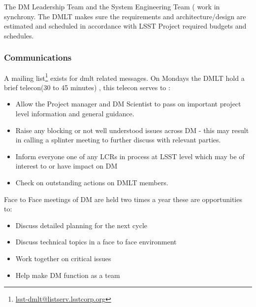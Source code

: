 The DM Leadership Team and the System Engineering Team ( work in synchrony. 
The DMLT makes sure the requirements and architecture/design are estimated and scheduled in accordance with LSST Project required budgets and schedules.

 \subsubsection{Communications} 
 A mailing list\footnote{\url{lsst-dmlt@listserv.lsstcorp.org}} exists for dmlt related messages. 
 On Mondays the DMLT hold a brief telecon(30 to 45 minutes) , this telecon serves to :
\begin{itemize}
\item Allow the Project manager and DM Scientist  to pass on important project level information and general guidance. 
\item Raise any blocking or not well understood issues across DM - this may result in calling a splinter meeting to further discuss with relevant parties.
\item Inform everyone one of any LCRs in process at LSST level which may be of interest to or  have impact on DM
\item Check on outstanding actions on DMLT members. 
\end{itemize}

Face to Face meetings of DM are held two times a year these are opportunities to:
\begin{itemize}
\item Discuss detailed planning for the next cycle
\item Discuss technical topics in a face to face environment
\item Work together on critical issues
\item Help make DM function as a team
\end{itemize}


